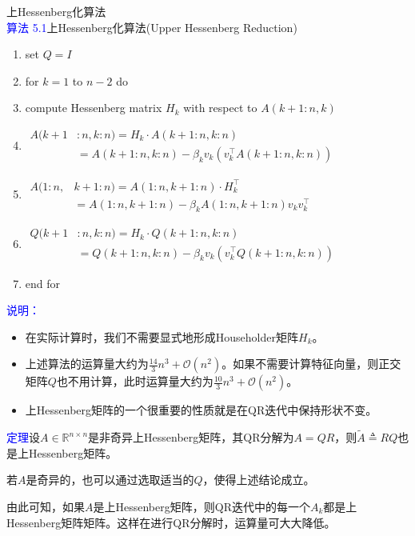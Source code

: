 \documentclass[12pt,a4paper]{article}
\begin{document}
上Hessenberg化算法\\
\textcolor{blue}{算法 5.1}\quad 上Hessenberg化算法(Upper Hessenberg Reduction)
\begin{enumerate}[1:]
	\item set $Q=I$
	\item for $k=1$ to $n-2$ do
	\item \quad compute Hessenberg matrix $H_k$ with respect to $A(k+1:n,k)$
	\item \quad $\begin{aligned} A(k+1& : n, k : n )=H_{k} \cdot A(k+1 : n, k : n) \\ &=A(k+1 : n, k : n)-\beta_{k} v_{k}\left(v_{k}^{\top} A(k+1 : n, k : n)\right) \end{aligned}$
	\item \quad $\begin{aligned} A(1 : n, &k+1 : n)=A(1 : n, k+1 : n) \cdot H_{k}^{\top}\\
	&=A(1 : n, k+1 : n)-\beta_{k} A(1 : n, k+1 : n) v_{k} v_{k}^{\top} \end{aligned}$
	\item \quad $\begin{aligned} Q(k+1& : n, k : n )=H_{k} \cdot Q(k+1 : n, k : n) \\ &=Q(k+1 : n, k : n)-\beta_{k} v_{k}\left(v_{k}^{\top} Q(k+1 : n, k : n)\right) \end{aligned}$
	\item end for
\end{enumerate}

\textcolor{blue}{说明：}
\begin{itemize}
	\item 在实际计算时，我们不需要显式地形成Householder矩阵$H_k$。
	\item 上述算法的运算量大约为$\frac{14}{3} n^{3}+\mathcal{O}\left(n^{2}\right)$。如果不需要计算特征向量，则正交矩阵$Q$也不用计算，此时运算量大约为$\frac{10}{3} n^{3}+\mathcal{O}\left(n^{2}\right)$。
	\item 上Hessenberg矩阵的一个很重要的性质就是在QR迭代中保持形状不变。
\end{itemize}

\textcolor{blue}{定理}\quad 设$A \in \mathbb{R}^{n \times n}$是非奇异上Hessenberg矩阵，其QR分解为$A=QR$，则$\tilde{A} \triangleq R Q$也是上Hessenberg矩阵。

若$A$是奇异的，也可以通过选取适当的$Q$，使得上述结论成立。

由此可知，如果$A$是上Hessenberg矩阵，则QR迭代中的每一个$A_k$都是上Hessenberg矩阵矩阵。这样在进行QR分解时，运算量可大大降低。
\end{document}
